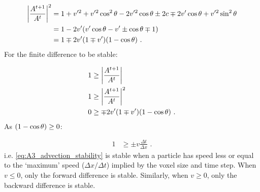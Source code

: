 \begin{equation}
    \begin{aligned}
    \bigg| \frac{A^{t+1}}{A^t} \bigg|^2&=1+v'^2+v'^2\cos^2\theta - 2v'^2\cos\theta \pm 2c \mp 2v'\cos\theta + v'^2\sin^2\theta \\
    &=1-2v'\qty(v'\cos\theta -v'\pm \cos\theta \mp 1) \\
    &=1\mp 2v'\qty(1\mp v')\qty(1-\cos\theta)\text{ .} 
    \end{aligned}
\end{equation}
\noindent For the finite difference to be stable:

\begin{equation}
    \begin{aligned}
    1&\geq \bigg| \frac{A^{t+1}}{A^t} \bigg|\\
    1&\geq\bigg| \frac{A^{t+1}}{A^t} \bigg|^2\\
    0&\geq \mp 2v'\qty(1\mp v')\qty(1-\cos\theta)\text{ .} 
    \end{aligned}
\end{equation}
\noindent As $\qty(1-\cos\theta)\geq 0$:

\begin{equation}
    \begin{aligned}
    1&\geq \pm v\frac{\Delta t}{\Delta x}\text{ .} 
    \end{aligned} \label{eq:A3_advection_stability}
\end{equation}
\noindent i.e. \autoref{eq:A3_advection_stability} is stable when a particle has speed less or equal to the `maximum' speed ($\Delta x/\Delta t$) implied by the voxel size and time step. When $v\leq 0$, only the forward difference is stable. Similarly, when $v\geq 0$, only the backward difference is stable.